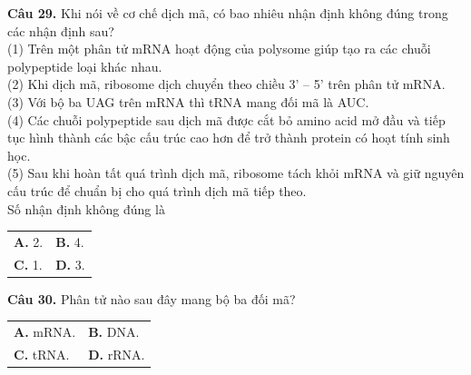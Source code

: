 \documentclass{article}
\begin{document}
\begin{minipage}[t][14.4cm][t]{\linewidth}
\fontsize{18}{23}\selectfont

\textbf{Câu 29.} Khi nói về cơ chế dịch mã, có bao nhiêu nhận định không đúng trong các nhận định sau?\\[3pt](1) Trên một phân tử mRNA hoạt động của polysome giúp tạo ra các chuỗi polypeptide loại khác nhau.\\[3pt](2) Khi dịch mã, ribosome dịch chuyển theo chiều 3' – 5' trên phân tử mRNA.\\[3pt](3) Với bộ ba UAG trên mRNA thì tRNA mang đối mã là AUC.\\[3pt](4) Các chuỗi polypeptide sau dịch mã được cắt bỏ amino acid mở đầu và tiếp tục hình thành các bậc cấu trúc cao hơn để trở thành protein có hoạt tính sinh học.\\[3pt](5) Sau khi hoàn tất quá trình dịch mã, ribosome tách khỏi mRNA và giữ nguyên cấu trúc để chuẩn bị cho quá trình dịch mã tiếp theo.\\[3pt]Số nhận định không đúng là\\[4pt]
\begin{tabularx}{\linewidth}{@{}X X@{}}
\textbf{A. } 2. & \textbf{B. } 4.\\[4pt]
\textbf{C. } 1. & \textbf{D. } 3.
\end{tabularx}
\vspace*{\fill}
\textbf{Câu 30.} Phân tử nào sau đây mang bộ ba đối mã?\\[4pt]
\begin{tabularx}{\linewidth}{@{}X X@{}}
\textbf{A. } mRNA. & \textbf{B. } DNA.\\[4pt]
\textbf{C. } tRNA. & \textbf{D. } rRNA.
\end{tabularx}

\end{minipage}
\newpage
\end{document}
